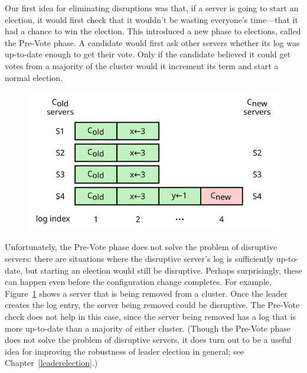 Our first idea for eliminating disruptions was that, if a server is
going to start an election, it would first check that it wouldn't be
wasting everyone's time---that it had a chance to win the election.
This introduced a
new phase to elections, called the Pre-Vote phase. A candidate would
first ask other servers whether its log was up-to-date enough to get
their vote. Only if the candidate believed it could get votes from a
majority of the cluster would it increment its term and start a normal
election.

\begin{figure}
\centering
\includegraphics[scale=1]{membership/disruptive}
\label{fig:membership:disruptive}
\end{figure}

Unfortunately, the Pre-Vote phase does not solve the problem of
disruptive servers: there are situations where the disruptive server's
log is sufficiently up-to-date, but starting an election would still be
disruptive. Perhaps surprisingly, these can happen even before the
configuration change completes. For example,
Figure~\ref{fig:membership:disruptive} shows a server that is being
removed from a cluster. Once the leader creates the \cnew{} log entry,
the server being removed could be disruptive. The Pre-Vote check does
not help in this case, since the server being removed has a log that is
more up-to-date than a majority of either cluster. (Though the Pre-Vote
phase does not solve the problem of disruptive servers, it does turn out
to be a useful idea for improving the robustness of leader election in
general; see Chapter~\ref{leaderelection}.)

